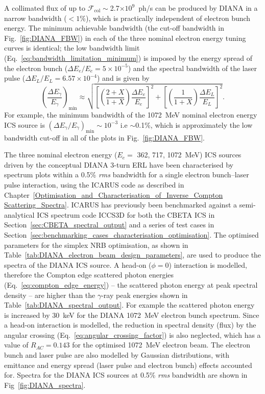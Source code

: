 \documentclass[../main.tex]{subfiles}
\begin{document}
A collimated flux of up to $\mathcal{F}_{\mathrm{col}}\sim$2.7$\times 10^{9}$~ph/\si{\second} can be produced by DIANA in a narrow bandwidth ($<1$\%), which is practically independent of electron bunch energy. The minimum achievable bandwidth (the cut-off bandwidth in Fig.~\ref{fig:DIANA_FBW}) in each of the three nominal electron energy tuning curves is identical; the low bandwidth limit (Eq.~\ref{eq:bandwidth_limitation_minimum}) is imposed by the energy spread of the electron bunch ($\Delta E_{e}/E_{e} = 5\times 10^{-5}$) and the spectral bandwidth of the laser pulse ($\Delta E_{L}/E_{L}=6.57\times 10^{-4}$) and is given by   
\begin{equation*}
\left(\frac{\Delta E_{\gamma}}{E_{\gamma}}\right)_{\mathrm{min}} \approx \sqrt{\left[\left(\frac{2+X}{1+X}\right)\frac{\Delta E_{e}}{E_{e}}\right]^{2} + \left[\left(\frac{1}{1+X}\right)\frac{\Delta E_{L}}{E_{L}}\right]^{2}}.
\end{equation*}
For example, the minimum bandwidth of the 1072~\si{\mega\electronvolt} nominal electron energy ICS source is $\left(\Delta E_{\gamma}/E_{\gamma}\right)_{\mathrm{min}} \sim 10^{-3}$ i.e $\sim$0.1\%, which is approximately the low bandwidth cut-off in all of the plots in Fig.~\ref{fig:DIANA_FBW}. 
   
The three nominal electron energy ($E_{e} =$ 362, 717, 1072~\si{\mega\electronvolt}) ICS sources driven by the conceptual DIANA 3-turn ERL have been characterised by spectrum plots within a 0.5\% \textit{rms} bandwidth for a single electron bunch--laser pulse interaction, using the \textsc{ICARUS} code as described in Chapter~\ref{Optimisation_and_Characterisation_of_Inverse_Compton Scattering_Spectra}. \textsc{ICARUS} has previously been benchmarked against a semi-analytical ICS spectrum code \textsc{ICCS3D} \cite{krafft2016laser,ranjan2018simulation} for both the CBETA ICS in Section~\ref{sec:CBETA_spectral_output} and a series of test cases in Section~\ref{sec:benchmarking_cases_characterisation_optimisation}. The optimised parameters for the simplex NRB optimisation, as shown in Table~\ref{tab:DIANA_electron_beam_design_parameters}, are used to produce the spectra of the DIANA ICS source. A head-on ($\phi=0$) interaction is modelled, therefore the Compton edge scattered photon energies (Eq.~\ref{eq:compton_edge_energy}) -- the scattered photon energy at peak spectral density -- are higher than the $\gamma$-ray peak energies shown in Table~\ref{tab:DIANA_spectral_output}. For example the scattered photon energy is increased by 30~\si{\kilo\electronvolt} for the DIANA 1072~\si{\mega\electronvolt} electron bunch spectrum. Since a head-on interaction is modelled, the reduction in spectral density (flux) by the angular crossing (Eq.~\ref{eq:angular_crossing_factor}) is also neglected, which has a value of $R_{AC}=0.143$ for the optimised 1072~\si{\mega\electronvolt} electron beam.
The electron bunch and laser pulse are also modelled by Gaussian distributions, with emittance and energy spread (laser pulse and electron bunch) effects accounted for. Spectra for the DIANA ICS sources at 0.5\% \textit{rms} bandwidth are shown in Fig~\ref{fig:DIANA_spectra}.
\end{document}
